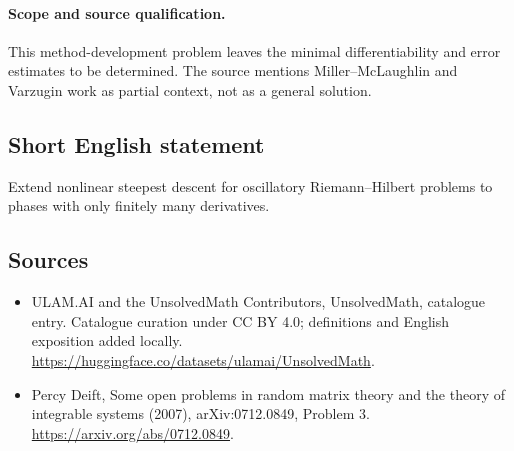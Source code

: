 \documentclass[11pt]{article}
\begin{document}
\paragraph{Scope and source qualification.}This method-development problem leaves the minimal differentiability and error estimates to be determined. The source mentions Miller--McLaughlin and Varzugin work as partial context, not as a general solution.
\subsection{Short English statement}
Extend nonlinear steepest descent for oscillatory Riemann--Hilbert problems to phases with only finitely many derivatives.
\subsection{Sources}
\begin{itemize}
\item[\hypertarget{source:statement:1}{S1}] ULAM.AI and the UnsolvedMath Contributors, UnsolvedMath, catalogue entry. Catalogue curation under CC BY 4.0; definitions and English exposition added locally.
\url{https://huggingface.co/datasets/ulamai/UnsolvedMath}.
\item[\hypertarget{source:statement:2}{S2}] Percy Deift, Some open problems in random matrix theory and the theory of integrable systems (2007), arXiv:0712.0849, Problem 3.
\url{https://arxiv.org/abs/0712.0849}.
\end{itemize}
\label{end:statement}
\end{document}
